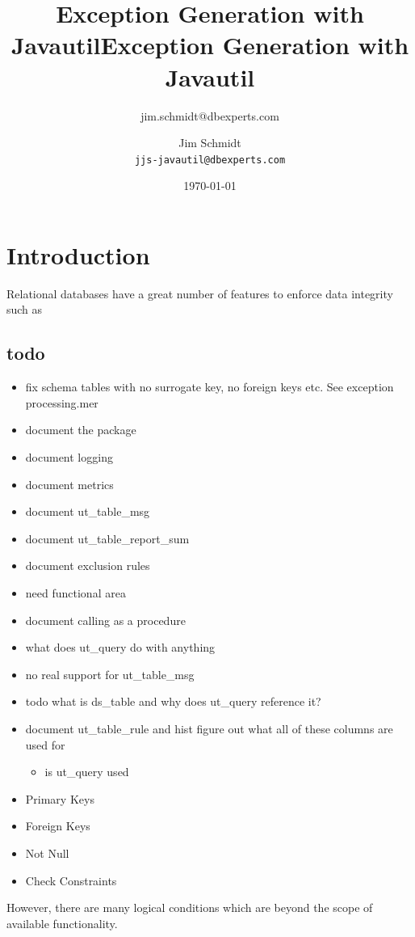 \documentclass[a4paper,10pt]{book}
\title{Exception Generation with Javautil}
\author{jim.schmidt@dbexperts.com}
\begin{document}
\title{Exception Generation with Javautil}
\author{Jim Schmidt\\
  \texttt{jjs-javautil@dbexperts.com}}
\date{\today}
\maketitle
\tableofcontents
\chapter{Introduction}
Relational databases have a great number of features to enforce data integrity such as

\section{todo}
\begin{itemize} 
 \item fix schema tables with no surrogate key, no foreign keys etc. See exception processing.mer
 \item document the package
 \item document logging
 \item document metrics
 \item document ut_table_msg
 \item document ut_table_report_sum
 \item document exclusion rules
 \item need functional area
 \item document calling as a procedure
 \item what does ut_query do with anything
 \item no real support for ut_table_msg
  \item todo what is ds_table and why does ut_query reference it?
 \item document ut_table_rule and hist figure out what all of these columns are used for
 \begin{itemize}
  \item is ut_query used
 \end{itemize}

\end{itemize}

\begin{itemize}
 \item Primary Keys
 \item Foreign Keys
 \item Not Null
 \item Check Constraints
\end{itemize}
However, there are many logical conditions which are beyond the scope of available functionality.
\end{document}
